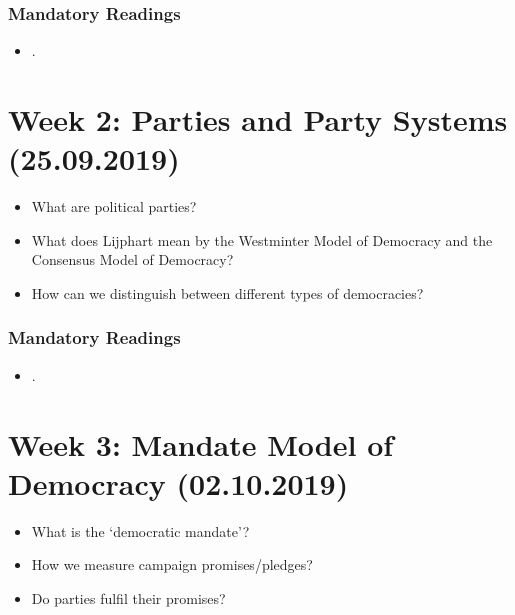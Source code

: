 \documentclass[abstract=on,parskip=full,headings=standardclasses,fontsize=11pt,paper=a4]{scrartcl}
\begin{document}
\subsubsection*{Mandatory Readings}
\begin{itemize}
\item {}.
\end{itemize}


\section{Week 2: Parties and Party Systems (25.09.2019)}

\begin{itemize}
\renewcommand\labelitemi{--}
\item  What are political parties?
\item What does Lijphart mean by the Westminter Model of Democracy and the Consensus Model of Democracy?
\item How can we distinguish between different types of democracies?
\end{itemize}

\subsubsection*{Mandatory Readings}
\begin{itemize}
\item {}.
\end{itemize}



\section{Week 3:  Mandate Model of Democracy (02.10.2019)}



\begin{itemize}
\renewcommand\labelitemi{--}
\item What is the `democratic mandate'? 
\item How we measure campaign promises/pledges?
\item Do parties fulfil their promises?
\end{itemize}
\end{document}
